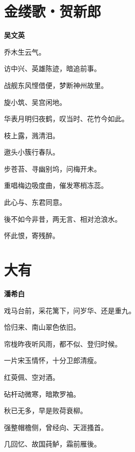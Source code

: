 \documentclass[12pt,a4paper]{ctexbook}
\begin{document}
\section{金缕歌・贺新郎}
\textbf{吴文英}\par\vspace{0.5em}
乔木生云气。\par
访中兴、英雄陈迹，暗追前事。\par
战舰东风悭借便，梦断神州故里。\par
旋小筑、吴宫闲地。\par
华表月明归夜鹤，叹当时、花竹今如此。\par
枝上露，溅清泪。\par
遨头小簇行春队。\par
步苍苔、寻幽别坞，问梅开未。\par
重唱梅边吸度曲，催发寒梢冻蕊。\par
此心与、东君同意。\par
後不如今非昔，两无言、相对沧浪水。\par
怀此恨，寄残醉。\par

\section{大有}
\textbf{潘希白}\par\vspace{0.5em}
戏马台前，采花篱下，问岁华、还是重九。\par
恰归来、南山翠色依旧。\par
帘栊昨夜听风雨，都不似、登归时候。\par
一片宋玉情怀，十分卫郎清瘦。\par
红萸佩、空对酒。\par
砧杆动微寒，暗欺罗袖。\par
秋已无多，早是败荷衰柳。\par
强整帽檐侧，曾经向、天涯搔首。\par
几回忆、故国莼鲈，霜前雁後。\par
\end{document}
